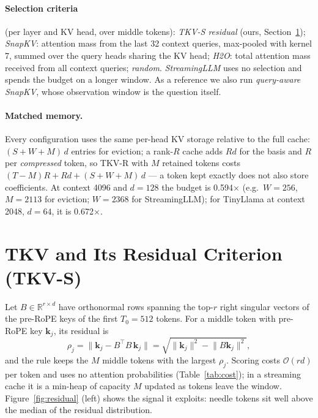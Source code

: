 \documentclass{article}
\newcommand{\R}{\mathbb{R}}
\begin{document}
\paragraph{Selection criteria} (per layer and KV head, over middle tokens):
\emph{TKV-S residual} (ours, Section~\ref{sec:method}); \emph{SnapKV}: attention mass
from the last 32 context queries, max-pooled with kernel 7, summed over the
query heads sharing the KV head; \emph{H2O}: total attention mass received
from all context queries; \emph{random}. \emph{StreamingLLM} uses no selection
and spends the budget on a longer window. As a reference we also run
\emph{query-aware SnapKV}, whose observation window is the question itself.

\paragraph{Matched memory.}
Every configuration uses the same per-head KV storage relative to the full
cache: $(S + W + M)\,d$ entries for eviction; a rank-$R$ cache adds $Rd$ for the
basis and $R$ per \emph{compressed} token, so TKV-R with $M$ retained tokens
costs $(T - M)R + Rd + (S + W + M)\,d$ --- a token kept exactly does not also
store coefficients. At context 4096 and $d{=}128$ the budget is 0.594$\times$
(e.g.\ $W{=}256$, $M{=}2113$ for eviction; $W{=}2368$ for StreamingLLM); for
TinyLlama at context 2048, $d{=}64$, it is 0.672$\times$.

\section{TKV and Its Residual Criterion (TKV-S)}
\label{sec:method}

Let $B \in \R^{r\times d}$ have orthonormal rows spanning the top-$r$ right
singular vectors of the pre-RoPE keys of the first $T_0{=}512$ tokens. For a
middle token with pre-RoPE key $\mathbf{k}_j$, its residual is
\[
\rho_j = \lVert \mathbf{k}_j - B^\top B\,\mathbf{k}_j\rVert
       = \sqrt{\lVert\mathbf{k}_j\rVert^2 - \lVert B\mathbf{k}_j\rVert^2},
\]
and the rule keeps the $M$ middle tokens with the largest $\rho_j$. Scoring
costs $\mathcal{O}(rd)$ per token and uses no attention probabilities
(Table~\ref{tab:cost}); in a streaming cache it is a min-heap of capacity $M$
updated as tokens leave the window. Figure~\ref{fig:residual} (left) shows the
signal it exploits: needle tokens sit well above the median of the residual
distribution.
\end{document}
